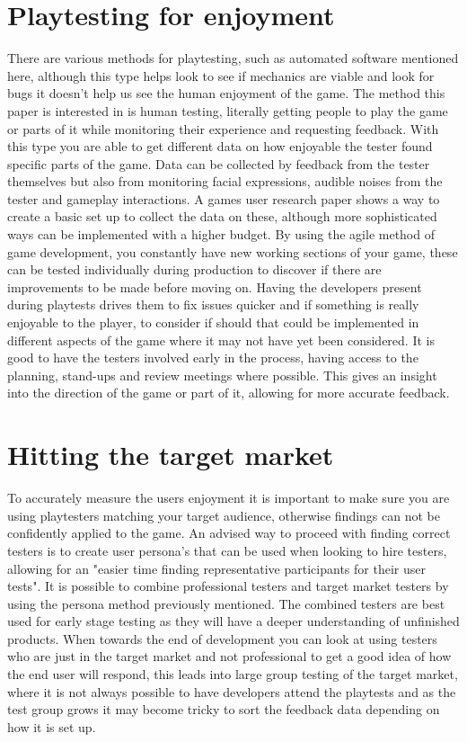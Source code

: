 \documentclass{scrartcl}
\begin{document}
\section{Playtesting for enjoyment}
There are various methods for playtesting, such as automated software mentioned  here\cite{powley2016semi}, although this type helps look to see if mechanics are viable and look for bugs it doesn't help us see the human enjoyment of the game. The method this paper is interested in is human testing, literally getting people to play the game or parts of it while monitoring their experience and requesting feedback. With this type you are able to get different data on how enjoyable the tester found specific parts of the game. Data can be collected by feedback from the tester themselves but also from monitoring facial expressions, audible noises from the tester and gameplay interactions. A games user research\cite{moosajee2016games} paper shows a way to create a basic set up to collect the data on these, although more sophisticated ways can be implemented with a higher budget. By using the agile method of game development, you constantly have new working sections of your game, these can be tested individually during production to discover if there are improvements to be made before moving on. Having the developers present during playtests drives them to fix issues quicker and if something is really enjoyable to the player, to consider if should that could be implemented in different aspects of the game where it may not have yet been considered\cite{moosajee2016games}. It is good to have the testers involved early in the process, having access to the planning, stand-ups and review meetings where possible\cite{cruzes2016communication}. This gives an insight into the direction of the game or part of it, allowing for more accurate feedback.

\section{Hitting the target market}
To accurately measure the users enjoyment it is important to make sure you are using playtesters matching your target audience, otherwise findings can not be confidently applied to the game\cite{moosajee2016games}. An advised way to proceed with finding correct testers is to create user persona's that can be used when looking to hire testers, allowing for an "easier time finding representative participants for their user tests"\cite{moosajee2016games}. It is possible to combine professional testers and target market testers by using the persona method previously mentioned. The combined testers are best used for early stage testing as they will have a deeper understanding of unfinished products\cite{ollila2008using}. When towards the end of development you can look at using testers who are just in the target market and not professional to get a good idea of how the end user will respond, this leads into large group testing of the target market, where it is not always possible to have developers attend the playtests and as the test group grows it may become tricky to sort the feedback data depending on how it is set up.
\end{document}
